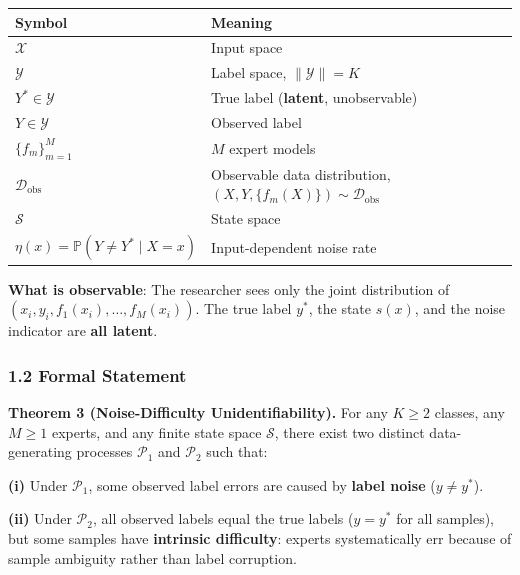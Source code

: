 \documentclass[
  12pt,
]{ctexart}
\begin{document}
\begin{longtable}[]{@{}
  >{\raggedright\arraybackslash}p{}
  >{\raggedright\arraybackslash}p{}@{}}
\toprule\noalign{}
\begin{minipage}[b]{\linewidth}\raggedright
Symbol
\end{minipage} & \begin{minipage}[b]{\linewidth}\raggedright
Meaning
\end{minipage} \\
\midrule\noalign{}
\endhead
\bottomrule\noalign{}
\endlastfoot
\(\mathcal{X}\) & Input space \\
\(\mathcal{Y}\) & Label space, \(\|\mathcal{Y}\| = K\) \\
\(Y^* \in \mathcal{Y}\) & True label (\textbf{latent}, unobservable) \\
\(Y \in \mathcal{Y}\) & Observed label \\
\(\{f_m\}_{m=1}^M\) & \(M\) expert models \\
\(\mathcal{D}_{\text{obs}}\) & Observable data distribution,
\((X, Y, \{f_m(X)\}) \sim \mathcal{D}_{\text{obs}}\) \\
\(\mathcal{S}\) & State space \\
\(\eta(x) = \mathbb{P}(Y \neq Y^* \mid X = x)\) & Input-dependent noise
rate \\
\end{longtable}

\textbf{What is observable}: The researcher sees only the joint
distribution of \((x_i, y_i, f_1(x_i), \dots, f_M(x_i))\). The true
label \(y^*\), the state \(s(x)\), and the noise indicator are
\textbf{all latent}.

\subsubsection{1.2 Formal Statement}\label{formal-statement}

\textbf{Theorem 3 (Noise-Difficulty Unidentifiability).} For any
\(K \geq 2\) classes, any \(M \geq 1\) experts, and any finite state
space \(\mathcal{S}\), there exist two distinct data-generating
processes \(\mathcal{P}_1\) and \(\mathcal{P}_2\) such that:

\textbf{(i)} Under \(\mathcal{P}_1\), some observed label errors are
caused by \textbf{label noise} (\(y \neq y^*\)).

\textbf{(ii)} Under \(\mathcal{P}_2\), all observed labels equal the
true labels (\(y = y^*\) for all samples), but some samples have
\textbf{intrinsic difficulty}: experts systematically err because of
sample ambiguity rather than label corruption.
\end{document}
